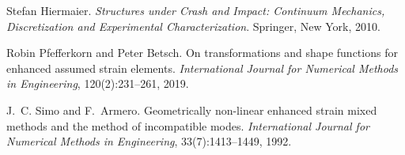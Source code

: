 \begin{DoxyDescription}
\item[\label{a03319_CITEREF_hiermaierStructuresCrashImpact2010}%
\Hypertarget{a03319_CITEREF_hiermaierStructuresCrashImpact2010}%
\mbox{[}8\mbox{]}]Stefan Hiermaier. {\itshape Structures under Crash and Impact\+: Continuum Mechanics, Discretization and Experimental Characterization}. Springer, New York, 2010.


\item[\label{a03319_CITEREF_pfefferkornTransformationsShapeFunctions2019b}%
\Hypertarget{a03319_CITEREF_pfefferkornTransformationsShapeFunctions2019b}%
\mbox{[}9\mbox{]}]Robin Pfefferkorn and Peter Betsch. On transformations and shape functions for enhanced assumed strain elements. {\itshape International Journal for Numerical Methods in Engineering}, 120(2)\+:231--261, 2019. 


\item[\label{a03319_CITEREF_simoGeometricallyNonlinearEnhanced1992a}%
\Hypertarget{a03319_CITEREF_simoGeometricallyNonlinearEnhanced1992a}%
\mbox{[}10\mbox{]}]J.~C. Simo and F.~Armero. Geometrically non-\/linear enhanced strain mixed methods and the method of incompatible modes. {\itshape International Journal for Numerical Methods in Engineering}, 33(7)\+:1413--1449, 1992. 


\end{DoxyDescription}